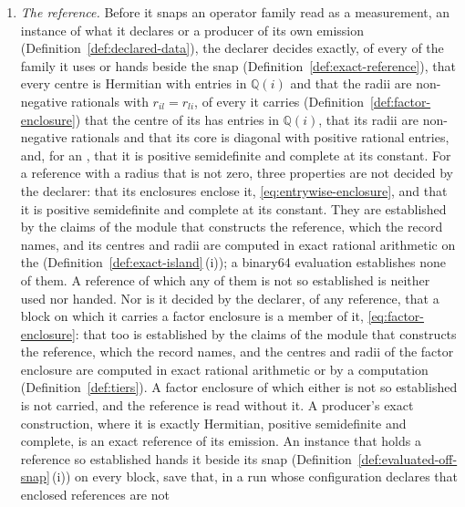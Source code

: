 \begin{requirement}\label{req:snap-reference}
\begin{enumerate}[label=(\roman*),leftmargin=2.4em]
\item \emph{The reference.} Before it snaps an operator family read as a
  measurement, an instance of what it declares or a producer of its own
  emission (Definition~\ref{def:declared-data}), the declarer decides
  exactly, of every  of the family it uses or hands beside
  the snap (Definition~\ref{def:exact-reference}), that every centre is
  Hermitian with entries in $\mathbb{Q}(i)$ and that the radii are
  non-negative rationals with $r_{il}=r_{li}$, of every  it carries (Definition~\ref{def:factor-enclosure}) that the
  centre of its  has entries in $\mathbb{Q}(i)$, that its
  radii are non-negative rationals and that its core is diagonal with
  positive rational entries, and, for an , that it is
  positive semidefinite and complete at its constant. For a reference with a
  radius that is not zero, three properties are not decided by the declarer:
  that its enclosures enclose it, \eqref{eq:entrywise-enclosure}, and that it
  is positive semidefinite and complete at its constant. They are
  established by the claims of the module that constructs the reference,
  which the record names, and its centres and radii are computed in exact
  rational arithmetic on the 
  (Definition~\ref{def:exact-island}\,(i)); a binary64 evaluation
  establishes none of them. A reference of which any of them is not so
  established is neither used nor handed. Nor is it decided by the
  declarer, of any reference, that a block on which it carries a factor
  enclosure is a member of it, \eqref{eq:factor-enclosure}: that too is
  established by the claims of the module that constructs the reference,
  which the record names, and the centres and radii of the factor enclosure are computed in exact
  rational arithmetic or by a  computation
  (Definition~\ref{def:tiers}). A factor enclosure of which either is not so
  established is not carried, and the reference is read without it. A producer's exact
  construction, where it is exactly Hermitian, positive semidefinite and
  complete, is an exact reference of its emission. An instance that holds a
  reference so established hands it beside its snap
  (Definition~\ref{def:evaluated-off-snap}\,(i)) on every block, save that,
  in a run whose configuration declares that enclosed references are not

\end{enumerate}
\end{requirement}
